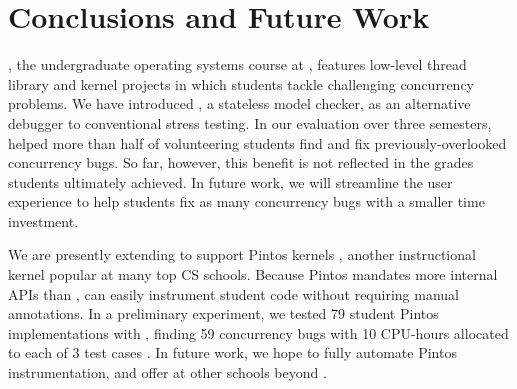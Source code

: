 \documentclass{sig-alternate-05-2015}
\begin{document}


\printccsdesc







\section{Conclusions and Future Work}

\fourten, the undergraduate operating systems course at \cmu,
features low-level thread library and kernel projects
in which students tackle challenging concurrency problems.
We have introduced \landslide, a stateless model checker,
as an alternative debugger to conventional stress testing.
In our evaluation over three semesters,
\landslide helped more than half of volunteering students find and fix previously-overlooked concurrency bugs.
So far, however, this benefit is not reflected in the grades students ultimately achieved.
In future work, we will streamline the user experience to help students fix as many concurrency bugs with a smaller time investment.

We are presently extending \landslide to support Pintos kernels \cite{pintos},
another instructional kernel popular at many top CS schools.
Because Pintos mandates more internal APIs than \pebbles,
\landslide can easily instrument student code without requiring manual annotations.
In a preliminary experiment, we tested 79 student Pintos implementations with \landslide,
finding 59 concurrency bugs with 10 CPU-hours allocated to each of 3 test cases \cite{quicksand-anonymized}.
In future work, we hope to fully automate Pintos instrumentation, and offer \landslide at other schools beyond \cmu.
\end{document}
